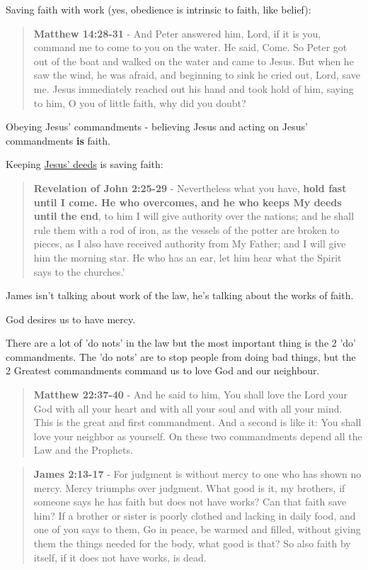 \documentclass[11pt]{article}
\begin{document}
Saving faith with work (yes, obedience is intrinsic to faith, like belief):

\begin{quote}
\textbf{Matthew 14:28-31} - And Peter answered him, Lord, if it is you, command me to come to you on the water. He said, Come. So Peter got out of the boat and walked on the water and came to Jesus. But when he saw the wind, he was afraid, and beginning to sink he cried out, Lord, save me. Jesus immediately reached out his hand and took hold of him, saying to him, O you of little faith, why did you doubt?
\end{quote}

Obeying Jesus' commandments - believing Jesus and acting on Jesus' commandments \textbf{is} faith.

Keeping \uline{Jesus' deeds} is saving faith:

\begin{quote}
\textbf{Revelation of John 2:25-29} - Nevertheless what you have, \textbf{hold fast until I come. He who overcomes, and he who keeps My deeds until the end}, to him I will give authority over the nations; and he shall rule them with a rod of iron, as the vessels of the potter are broken to pieces, as I also have received authority from My Father; and I will give him the morning star. He who has an ear, let him hear what the Spirit says to the churches.’
\end{quote}

James isn't talking about work of the law, he's talking about the works of faith.

God desires us to have mercy.

There are a lot of 'do nots' in the law but the most important thing is the 2 'do' commandments.
The 'do nots' are to stop people from doing bad things, but the 2 Greatest commandments command us to love God and our neighbour.

\begin{quote}
\textbf{Matthew 22:37-40} - And he said to him, You shall love the Lord your God with all your heart and with all your soul and with all your mind. This is the great and first commandment. And a second is like it: You shall love your neighbor as yourself. On these two commandments depend all the Law and the Prophets.
\end{quote}

\begin{quote}
\textbf{James 2:13-17} - For judgment is without mercy to one who has shown no mercy. Mercy triumphs over judgment. What good is it, my brothers, if someone says he has faith but does not have works? Can that faith save him? If a brother or sister is poorly clothed and lacking in daily food, and one of you says to them, Go in peace, be warmed and filled, without giving them the things needed for the body, what good is that? So also faith by itself, if it does not have works, is dead.
\end{quote}
\end{document}

